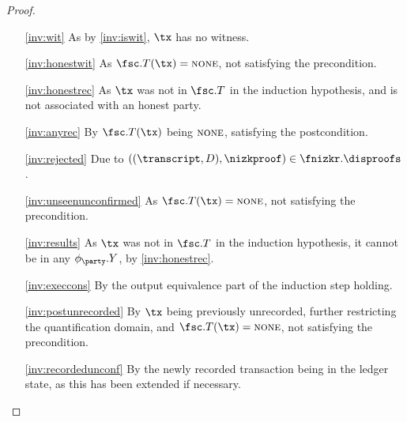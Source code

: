\begin{proof}
  \begin{enumerate}
    \item[\ref{inv:wit}] As by \ref{inv:iswit}, $\tx$ has no witness.
    \item[\ref{inv:honestwit}] As $\fsc.T(\tx) =
      \textsc{none}$, not satisfying the precondition.
    \item[\ref{inv:honestrec}] As $\tx$ was not in $\fsc.T$ in
      the induction hypothesis, and is not associated with an honest party.
    \item[\ref{inv:anyrec}] By $\fsc.T(\tx)$ being
      $\textsc{none}$, satisfying the postcondition.
    \item[\ref{inv:rejected}] Due to $((\transcript, D), \nizkproof) \in
      \fnizkr.\disproofs$.
    \item[\ref{inv:unseenunconfirmed}] As $\fsc.T(\tx) =
      \textsc{none}$, not satisfying the precondition.
    \item[\ref{inv:results}] As $\tx$ was not in $\fsc.T$ in the induction
      hypothesis, it cannot be in any $\phi_\party.Y$, by \ref{inv:honestrec}.
    \item[\ref{inv:execcons}] By the output equivalence part of the induction
      step holding.
    \item[\ref{inv:postunrecorded}] By $\tx$ being previously unrecorded,
      further restricting the quantification domain, and $\fsc.T(\tx) =
      \textsc{none}$, not satisfying the precondition.
    \item[\ref{inv:recordedunconf}] By the newly recorded transaction being in
      the ledger state, as this has been extended if necessary.
  \end{enumerate}


\end{proof}
